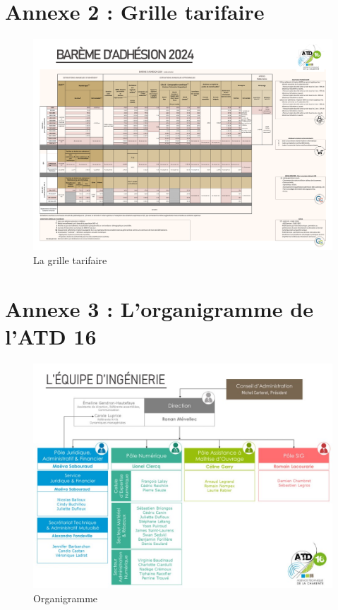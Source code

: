 \documentclass[a4paper,12pt]{report}
\begin{document}
\section{Annexe 2 : Grille tarifaire}
\begin{figure}[H]
    \centering
    \includegraphics[angle=90,scale=0.4]{images_rapport/ilovepdf_split/2024-Bareme-2.pdf}
    \caption{La grille tarifaire}
    \label{fig:grille-tarif}
\end{figure}
\section{Annexe 3 : L'organigramme de l'ATD 16}
\begin{figure}[H]
    \centering
    \includegraphics[angle=90,scale=0.6]{images_rapport/Diapositive8.jpg}
    \caption{Organigramme}
    \label{fig:organigramme}
\end{figure}
\end{document}
